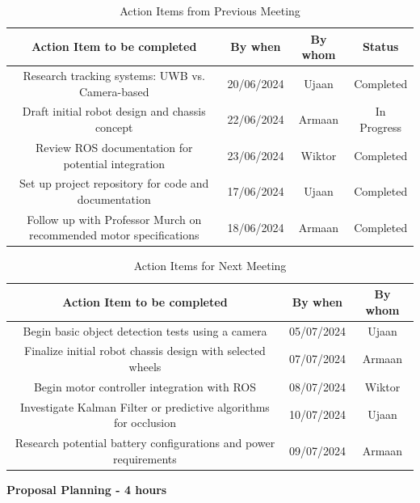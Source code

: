 \documentclass{article}
\begin{document}
\begin{table}[h]
    \centering
    \begin{tabular}{|c|c|c|c|}
        \hline
        \textbf{Action Item to be completed} & \textbf{By when} & \textbf{By whom} & \textbf{Status} \\
        \hline
        Research tracking systems: UWB vs. Camera-based & 20/06/2024 & Ujaan & Completed \\
        \hline
        Draft initial robot design and chassis concept & 22/06/2024 & Armaan & In Progress \\
        \hline
        Review ROS documentation for potential integration & 23/06/2024 & Wiktor & Completed \\
        \hline
        Set up project repository for code and documentation & 17/06/2024 & Ujaan & Completed \\
        \hline
        Follow up with Professor Murch on recommended motor specifications & 18/06/2024 & Armaan & Completed \\
        \hline
    \end{tabular}
    \caption{Action Items from Previous Meeting}
    \label{tab:action_items_previous_2}
\end{table}

\begin{table}[h]
    \centering
    \begin{tabular}{|c|c|c|}
        \hline
        \textbf{Action Item to be completed} & \textbf{By when} & \textbf{By whom} \\
        \hline
        Begin basic object detection tests using a camera & 05/07/2024 & Ujaan \\
        \hline
        Finalize initial robot chassis design with selected wheels & 07/07/2024 & Armaan \\
        \hline
        Begin motor controller integration with ROS & 08/07/2024 & Wiktor \\
        \hline
        Investigate Kalman Filter or predictive algorithms for occlusion & 10/07/2024 & Ujaan \\
        \hline
        Research potential battery configurations and power requirements & 09/07/2024 & Armaan \\
        \hline
    \end{tabular}
    \caption{Action Items for Next Meeting}
    \label{tab:action_items_next_2}
\end{table}

\textbf{Proposal Planning - 4 hours}
\end{document}
